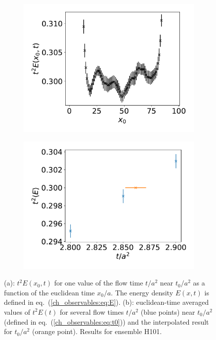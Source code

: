 \begin{figure}
    \begin{subfigure}{1.\textwidth}
    	\includegraphics[width=\textwidth]{./cap3/figs/t2E_H101_plat.pdf}
    	\caption{}
    \end{subfigure}
    \begin{subfigure}{1.\textwidth}
    	\includegraphics[width=\textwidth]{./cap3/figs/t0_H101.pdf}
    	\caption{}
    \end{subfigure}
    \caption{(a): $t^2E(x_0,t)$ for one value of the flow time $t/a^2$ near $t_0/a^2$ as a function of the euclidean time $x_0/a$. The energy density $E(x,t)$ is defined in eq.~(\ref{ch_observables:eq:E}). (b): euclidean-time averaged values of $t^2E(t)$ for several flow times $t/a^2$ (blue points) near $t_0/a^2$ (defined in eq.~(\ref{ch_observables:eq:t0})) and the interpolated result for $t_0/a^2$ (orange point). Results for ensemble H101.}
        \label{ch_observables:fig:t2E}
\end{figure}

